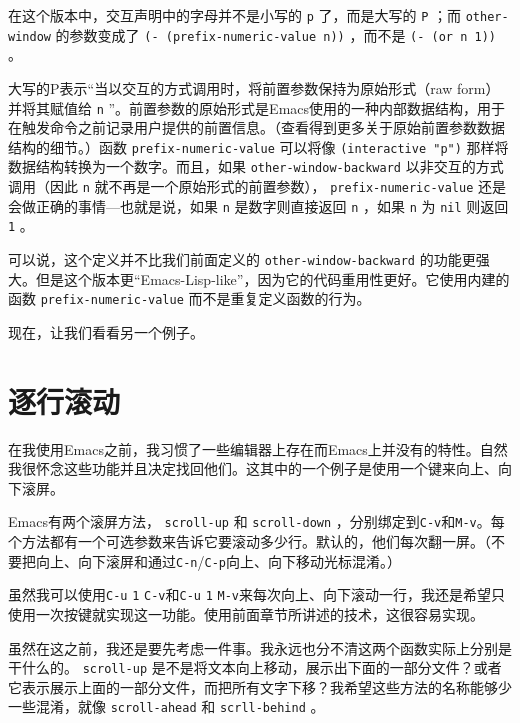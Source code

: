 在这个版本中，交互声明中的字母并不是小写的 \texttt{p} 了，而是大写的 \texttt{P} ；而 \texttt{other-window} 的参数变成了 \texttt{(- (prefix-numeric-value n))} ，而不是 \texttt{(- (or n 1))} 。

大写的P表示“当以交互的方式调用时，将前置参数保持为原始形式（raw form）并将其赋值给 \texttt{n} ”。前置参数的原始形式是Emacs使用的一种内部数据结构，用于在触发命令之前记录用户提供的前置信息。（查看得到更多关于原始前置参数数据结构的细节。）函数 \texttt{prefix-numeric-value} 可以将像 \texttt{(interactive "p")} 那样将数据结构转换为一个数字。而且，如果 \texttt{other-window-backward} 以非交互的方式调用（因此 \texttt{n} 就不再是一个原始形式的前置参数）， \texttt{prefix-numeric-value} 还是会做正确的事情---也就是说，如果 \texttt{n} 是数字则直接返回 \texttt{n} ，如果 \texttt{n} 为 \texttt{nil} 则返回 \texttt{1} 。

可以说，这个定义并不比我们前面定义的 \texttt{other-window-backward} 的功能更强大。但是这个版本更“Emacs-Lisp-like”，因为它的代码重用性更好。它使用内建的函数 \texttt{prefix-numeric-value} 而不是重复定义函数的行为。

现在，让我们看看另一个例子。

\section{逐行滚动}
\label{section:02-Line-at-a-Time-Scrolling}

在我使用Emacs之前，我习惯了一些编辑器上存在而Emacs上并没有的特性。自然我很怀念这些功能并且决定找回他们。这其中的一个例子是使用一个键来向上、向下滚屏。

Emacs有两个滚屏方法， \texttt{scroll-up} 和 \texttt{scroll-down} ，分别绑定到\verb|C-v|和\verb|M-v|。每个方法都有一个可选参数来告诉它要滚动多少行。默认的，他们每次翻一屏。（不要把向上、向下滚屏和通过\verb|C-n|/\verb|C-p|向上、向下移动光标混淆。）

虽然我可以使用\verb|C-u| \verb|1| \verb|C-v|和\verb|C-u| \verb|1| \verb|M-v|来每次向上、向下滚动一行，我还是希望只使用一次按键就实现这一功能。使用前面章节所讲述的技术，这很容易实现。

虽然在这之前，我还是要先考虑一件事。我永远也分不清这两个函数实际上分别是干什么的。 \texttt{scroll-up} 是不是将文本向上移动，展示出下面的一部分文件？或者它表示展示上面的一部分文件，而把所有文字下移？我希望这些方法的名称能够少一些混淆，就像 \texttt{scroll-ahead} 和 \texttt{scrll-behind} 。

